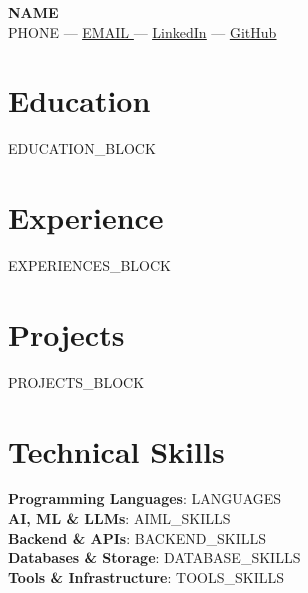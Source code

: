\documentclass[letterpaper,10pt]{article}
\newcommand{\resumeSubHeadingListStart}{\begin{itemize}[leftmargin=*]}
\newcommand{\resumeSubHeadingListEnd}{\end{itemize}}
\begin{document}
\begin{center}
    \textbf{\Huge \scshape {{ NAME }}} \\ \vspace{1pt}
    \small {{ PHONE }} --- \href{mailto:{{ EMAIL }}}{\underline{{{ EMAIL }}}} --- 
    \href{{{ LINKEDIN }}}{\underline{LinkedIn}} --- 
    \href{{{ GITHUB }}}{\underline{GitHub}}
\end{center}


\section{Education}
  \resumeSubHeadingListStart
{{ EDUCATION_BLOCK }}
  \resumeSubHeadingListEnd


\section{Experience}
  \resumeSubHeadingListStart
{{ EXPERIENCES_BLOCK }}
  \resumeSubHeadingListEnd


\section{Projects}
  \resumeSubHeadingListStart
{{ PROJECTS_BLOCK }}
  \resumeSubHeadingListEnd


\section{Technical Skills}
 \begin{itemize}[leftmargin=0.15in, label={}]
    \small{\item{
     \textbf{Programming Languages}{: {{ LANGUAGES }}} \\
     \textbf{AI, ML \& LLMs}{: {{ AIML_SKILLS }}} \\
     \textbf{Backend \& APIs}{: {{ BACKEND_SKILLS }}} \\
     \textbf{Databases \& Storage}{: {{ DATABASE_SKILLS }}} \\
     \textbf{Tools \& Infrastructure}{: {{ TOOLS_SKILLS }}}
    }}
 \end{itemize}

\end{document}
